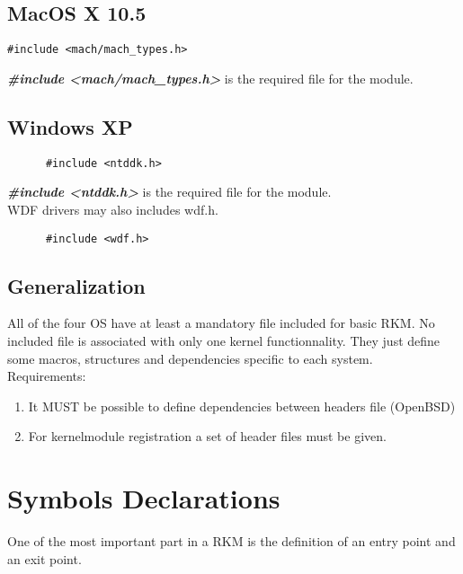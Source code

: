 \documentclass[11pt]{report}
\begin{document}
  \subsection{MacOS X 10.5}
    \begin{lstlisting}
#include <mach/mach_types.h>
    \end{lstlisting}
		{\bf \it \#include \textless mach/mach\_types.h\textgreater } is the required file for the module.\\ 
  \subsection{Windows XP}
    \begin{lstlisting}
      #include <ntddk.h>
    \end{lstlisting}
	{\bf \it \#include \textless ntddk.h\textgreater } is the required file for the module.\\
    WDF drivers may also includes wdf.h.
    \begin{lstlisting}
      #include <wdf.h>
    \end{lstlisting}
  \subsection{Generalization}
    All of the four OS have at least a mandatory file included for basic RKM.
    No included file is associated with only one kernel functionnality.
    They just define some macros, structures and dependencies specific to each system.\\
    Requirements:
  \begin{enumerate}
  	\item It MUST be possible to define dependencies between headers file (OpenBSD) 
	\item For kernelmodule registration a set of header files must be given.
  \end{enumerate}

\newpage
\section{Symbols Declarations}
One of the most important part in a RKM is the definition of an entry point
and an exit point.
\end{document}

